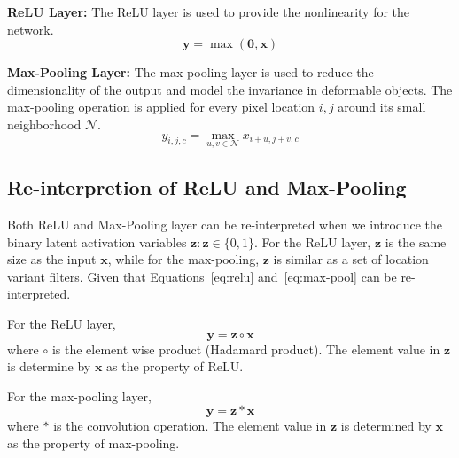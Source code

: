 \textbf{ReLU Layer:}
The ReLU layer is used to provide the nonlinearity for the network.
\begin{equation}
\mathbf{y} = \max (\mathbf{0}, \mathbf{x})
\label{eq:relu}
\end{equation} 

\textbf{Max-Pooling Layer:}
The max-pooling layer is used to reduce the dimensionality of the output and model the invariance in deformable objects. The max-pooling operation is applied for every pixel location $i,j$ around its small neighborhood $\mathcal{N}$.
\begin{equation}
y_{i,j,c} = \max_{u,v \in \mathcal{N}} x_{i+u, j+v, c}
\label{eq:max-pool}
\end{equation}

\subsection{Re-interpretion of ReLU and Max-Pooling}
Both ReLU and Max-Pooling layer can be re-interpreted when we introduce the binary latent activation variables $\mathbf{z}: \mathbf{z} \in \{0, 1\}$. For the ReLU layer, $\mathbf{z}$ is the same size as the input $\mathbf{x}$, while for the max-pooling, $\mathbf{z}$ is similar as a set of location variant filters. Given that Equations~\ref{eq:relu} and~\ref{eq:max-pool} can be re-interpreted.

For the ReLU layer, 
\begin{equation}
\mathbf{y} = \mathbf{z} \circ \mathbf{x}
\end{equation}
where $\circ$ is the element wise product (Hadamard product). The element value in $\mathbf{z}$ is determine by $\mathbf{x}$ as the property of ReLU.

For the max-pooling layer,
\begin{equation}
\mathbf{y} = \mathbf{z} * \mathbf{x}
\end{equation}
where $*$ is the convolution operation. The element value in $\mathbf{z}$ is determined by $\mathbf{x}$ as the property of max-pooling.


